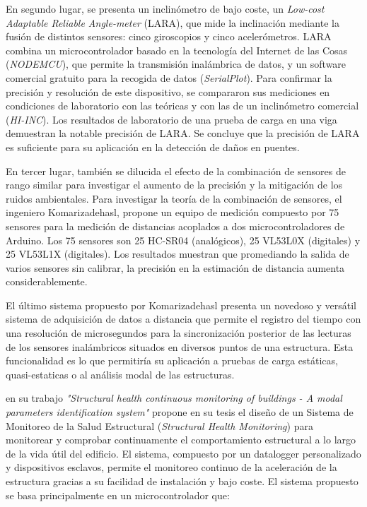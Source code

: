 En segundo lugar, se presenta un inclinómetro de bajo coste, un \textit{Low-cost Adaptable Reliable Angle-meter} (LARA), que mide la inclinación mediante la fusión de distintos sensores: cinco giroscopios y cinco acelerómetros. LARA combina un microcontrolador basado en la tecnología del Internet de las Cosas (\textit{NODEMCU}), que permite la transmisión inalámbrica de datos, y un software comercial gratuito para la recogida de datos (\textit{SerialPlot}). Para confirmar la precisión y resolución de este dispositivo, se compararon sus mediciones en condiciones de laboratorio con las teóricas y con las de un inclinómetro comercial (\textit{HI-INC}). Los resultados de laboratorio de una prueba de carga en una viga demuestran la notable precisión de LARA. Se concluye que la precisión de LARA es suficiente para su aplicación en la detección de daños en puentes.

En tercer lugar, también se dilucida el efecto de la combinación de sensores de rango similar para investigar el aumento de la precisión y la mitigación de los ruidos ambientales. Para investigar la teoría de la combinación de sensores, el ingeniero Komarizadehasl, propone un equipo de medición compuesto por 75 sensores para la medición de distancias acoplados a dos microcontroladores de Arduino. Los 75 sensores son 25 HC-SR04 (analógicos), 25 VL53L0X (digitales) y 25 VL53L1X (digitales). Los resultados muestran que promediando la salida de varios sensores sin calibrar, la precisión en la estimación de distancia aumenta considerablemente.

El último sistema propuesto por Komarizadehasl presenta un novedoso y versátil sistema de adquisición de datos a distancia que permite el registro del tiempo con una resolución de microsegundos para la sincronización posterior de las lecturas de los sensores inalámbricos situados en diversos puntos de una estructura. Esta funcionalidad es lo que permitiría su aplicación a pruebas de carga estáticas, quasi-estaticas o al análisis modal de las estructuras.

\cite{muttillo2019structural} en su trabajo \textit{"Structural health continuous monitoring of buildings - A modal parameters identification system"} propone en su tesis el diseño de un Sistema de Monitoreo de la Salud Estructural (\textit{Structural Health Monitoring}) para monitorear y comprobar continuamente el comportamiento estructural a lo largo de la vida útil del edificio. El sistema, compuesto por un datalogger personalizado y dispositivos esclavos, permite el monitoreo continuo de la aceleración de la estructura gracias a su facilidad de instalación y bajo coste. El sistema propuesto se basa principalmente en un microcontrolador que: 

